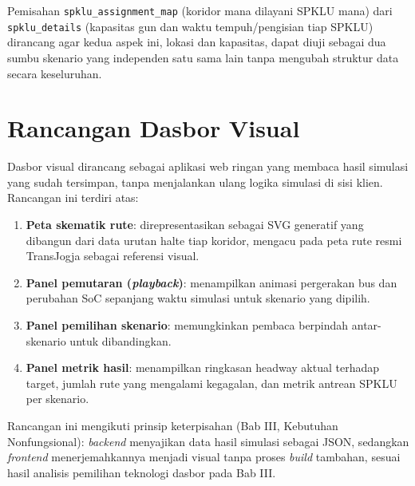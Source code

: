Pemisahan \texttt{spklu\_assignment\_map} (koridor mana dilayani SPKLU mana)
dari \texttt{spklu\_details} (kapasitas gun dan waktu tempuh/pengisian tiap
SPKLU) dirancang agar kedua aspek ini, lokasi dan kapasitas, dapat diuji
sebagai dua sumbu skenario yang independen satu sama lain tanpa mengubah
struktur data secara keseluruhan.

\section{Rancangan Dasbor Visual}

Dasbor visual dirancang sebagai aplikasi web ringan yang membaca hasil
simulasi yang sudah tersimpan, tanpa menjalankan ulang logika simulasi di
sisi klien. Rancangan ini terdiri atas:
\begin{enumerate}
	\item \textbf{Peta skematik rute}: direpresentasikan sebagai SVG generatif
	yang dibangun dari data urutan halte tiap koridor, mengacu pada peta rute
	resmi TransJogja sebagai referensi visual.
	\item \textbf{Panel pemutaran (\textit{playback})}: menampilkan animasi
	pergerakan bus dan perubahan SoC sepanjang waktu simulasi untuk skenario
	yang dipilih.
	\item \textbf{Panel pemilihan skenario}: memungkinkan pembaca berpindah
	antar-skenario untuk dibandingkan.
	\item \textbf{Panel metrik hasil}: menampilkan ringkasan headway aktual
	terhadap target, jumlah rute yang mengalami kegagalan, dan metrik antrean
	SPKLU per skenario.
\end{enumerate}
Rancangan ini mengikuti prinsip keterpisahan (Bab III, Kebutuhan
Nonfungsional): \textit{backend} menyajikan data hasil simulasi sebagai
JSON, sedangkan \textit{frontend} menerjemahkannya menjadi visual tanpa
proses \textit{build} tambahan, sesuai hasil analisis pemilihan teknologi
dasbor pada Bab III.